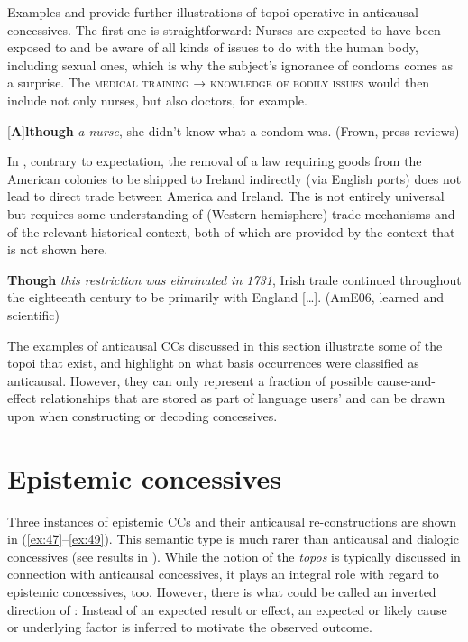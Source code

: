   Examples  and  provide further illustrations of topoi operative in anticausal concessives. The first one is straightforward: Nurses are expected to have been exposed to and be aware of all kinds of issues to do with the human body, including sexual ones, which is why the subject’s ignorance of condoms comes as a surprise. The  \textsc{medical} \textsc{training} → \textsc{knowledge} \textsc{of} \textsc{bodily} \textsc{issues} would then include not only nurses, but also doctors, for example.

\ea\label{ex:45}   \label{bkm:Ref487277585}[\textbf{A}]\textbf{lthough} \textit{a nurse}, she didn’t know what a condom was. (Frown, press reviews)\\
\z

In , contrary to expectation, the removal of a law requiring goods from the American colonies to be shipped to Ireland indirectly (via English ports) does not lead to direct trade between America and Ireland. The  is not entirely universal but requires some understanding of (Western-hemisphere) trade mechanisms and of the relevant historical context, both of which are provided by the context that is not shown here.

\ea\label{ex:46}   \label{bkm:Ref487449431}\textbf{Though} \textit{this restriction was eliminated in 1731}, Irish trade continued throughout the eighteenth century to be primarily with England […]. (AmE06, learned and scientific)\\
\z

The examples of anticausal CCs discussed in this section illustrate some of the topoi that exist, and highlight on what basis occurrences were classified as anticausal. However, they can only represent a fraction of possible cause-and-effect relationships that are stored as part of language users’  and can be drawn upon when constructing or decoding concessives.

\section{\label{bkm:Ref487443918}Epistemic concessives}\label{sec:3.2}

Three instances of epistemic CCs and their anticausal re-constructions are shown in (\ref{ex:47}–\ref{ex:49}). This semantic type is much rarer than anticausal and dialogic concessives (see results in ). While the notion of the \textit{topos} is typically discussed in connection with anticausal concessives, it plays an integral role with regard to epistemic concessives, too. However, there is what could be called an inverted direction of : Instead of an expected result or effect, an expected or likely cause or underlying factor is inferred to motivate the observed outcome.

